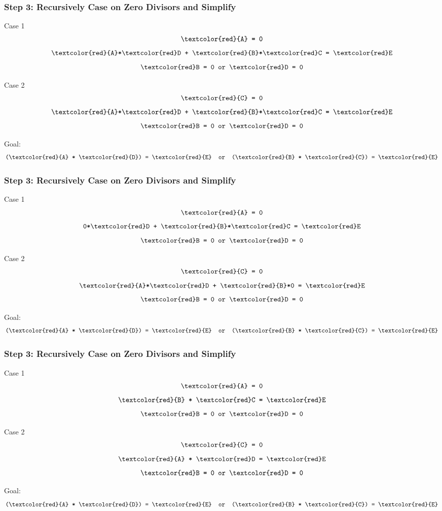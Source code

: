 \documentclass{beamer}
\begin{document}
\begin{frame}
    \frametitle{Step 3: Recursively Case on Zero Divisors and Simplify}

    \parbox[t]{5cm}{
    \centering
    Case 1
        $$ \texttt{\textcolor{red}{A} = 0}$$
        $$ \texttt{\textcolor{red}{A}*\textcolor{red}D + \textcolor{red}{B}*\textcolor{red}C = \textcolor{red}E} $$
        $$ \texttt{\textcolor{red}B = 0 or \textcolor{red}D = 0}  $$ }%
    \hspace{1cm}%
    \parbox[t]{5cm}{
    \centering
    Case 2
        $$ \texttt{\textcolor{red}{C} = 0}$$
        $$ \texttt{\textcolor{red}{A}*\textcolor{red}D + \textcolor{red}{B}*\textcolor{red}C = \textcolor{red}E} $$
        $$ \texttt{\textcolor{red}B = 0 or \textcolor{red}D = 0}  $$ }%


    Goal:
    $$\texttt{(\textcolor{red}{A} * \textcolor{red}{D}) = \textcolor{red}{E}  \text{ or } (\textcolor{red}{B} * \textcolor{red}{C}) = \textcolor{red}{E}}$$

\end{frame}

\begin{frame}
    \frametitle{Step 3: Recursively Case on Zero Divisors and Simplify}

    \parbox[t]{5cm}{
    \centering
    Case 1
        $$ \texttt{\textcolor{red}{A} = 0}$$
        $$ \texttt{0*\textcolor{red}D + \textcolor{red}{B}*\textcolor{red}C = \textcolor{red}E} $$
        $$ \texttt{\textcolor{red}B = 0 or \textcolor{red}D = 0}  $$ }%
    \hspace{1cm}%
    \parbox[t]{5cm}{
    \centering
    Case 2
        $$ \texttt{\textcolor{red}{C} = 0}$$
        $$ \texttt{\textcolor{red}{A}*\textcolor{red}D + \textcolor{red}{B}*0 = \textcolor{red}E} $$
        $$ \texttt{\textcolor{red}B = 0 or \textcolor{red}D = 0}  $$ }%


    Goal:
    $$\texttt{(\textcolor{red}{A} * \textcolor{red}{D}) = \textcolor{red}{E}  \text{ or } (\textcolor{red}{B} * \textcolor{red}{C}) = \textcolor{red}{E}}$$

\end{frame}

\begin{frame}

    \frametitle{Step 3: Recursively Case on Zero Divisors and Simplify}

    \parbox[t]{5cm}{
    \centering
    Case 1
        $$ \texttt{\textcolor{red}{A} = 0}$$
        $$ \texttt{\textcolor{red}{B} * \textcolor{red}C = \textcolor{red}E} $$
        $$ \texttt{\textcolor{red}B = 0 or \textcolor{red}D = 0}  $$ }%
    \hspace{1cm}%
    \parbox[t]{5cm}{
    \centering
    Case 2
        $$ \texttt{\textcolor{red}{C} = 0}$$
        $$ \texttt{\textcolor{red}{A} * \textcolor{red}D = \textcolor{red}E} $$
        $$ \texttt{\textcolor{red}B = 0 or \textcolor{red}D = 0}  $$ }%


    Goal:
    $$\texttt{(\textcolor{red}{A} * \textcolor{red}{D}) = \textcolor{red}{E}  \text{ or } (\textcolor{red}{B} * \textcolor{red}{C}) = \textcolor{red}{E}}$$

\end{frame}
\end{document}
